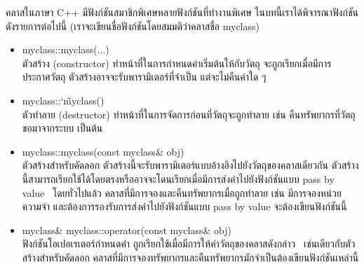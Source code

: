 ค{\wbr}ลา{\wbr}ส{\wbr}ใน{\wbr}ภาษา C++ มี{\wbr}ฟังก์ชัน{\wbr}สมาชิกพิเศษ{\wbr}หลาย{\wbr}ฟังก์ชัน{\wbr}ที่ทำงาน{\wbr}พิเศษ ใน{\wbr}บท{\wbr}นี้{\wbr}เรา{\wbr}ได้{\wbr}พิจารณา{\wbr}ฟังก์ชัน{\wbr}ดัง{\wbr}รายการ{\wbr}ต่อไปนี้ (เรา{\wbr}จะ{\wbr}เขียน{\wbr}ชื่อ{\wbr}ฟังก์ชัน{\wbr}โดย{\wbr}สมมติ{\wbr}ว่า{\wbr}ค{\wbr}ลา{\wbr}ส{\wbr}ชื่อ {\ct myclass})
\begin{itemize}
\item {\ct myclass::myclass(...)} \\ ตัว{\wbr}สร้าง (constructor)
  ทำ{\wbr}หน้าที่{\wbr}ใน{\wbr}การ{\wbr}กำหนด{\wbr}ค่า{\wbr}เริ่มต้น{\wbr}ให้{\wbr}กับ{\wbr}วัตถุ จะ{\wbr}ถูก{\wbr}เรียก{\wbr}เมื่อ{\wbr}มี{\wbr}การ{\wbr}ประกาศ{\wbr}วัตถุ{\wbr}
  ตัว{\wbr}สร้าง{\wbr}อาจ{\wbr}จะ{\wbr}รับ{\wbr}พารามิเตอร์{\wbr}ที่{\wbr}จำเป็น แต่{\wbr}จะ{\wbr}ไม่{\wbr}คืน{\wbr}ค่า{\wbr}ใด ๆ
\item {\ct myclass::\char`\~myclass()} \\ ตัว{\wbr}ทำลาย (destructor)
  ทำ{\wbr}หน้าที่{\wbr}ใน{\wbr}การ{\wbr}จัดการ{\wbr}ก่อน{\wbr}ที่{\wbr}วัตถุ{\wbr}จะ{\wbr}ถูก{\wbr}ทำลาย เช่น คืน{\wbr}ทรัพยากร{\wbr}ที่{\wbr}วัตถุ{\wbr}ขอ{\wbr}มา{\wbr}จาก{\wbr}ระบบ เป็นต้น{\wbr}
\item {\ct myclass::myclass(const myclass\& obj)} \\ ตัว{\wbr}สร้าง{\wbr}สำหรับ{\wbr}คัดลอก{\wbr}
  ตัว{\wbr}สร้าง{\wbr}นี้{\wbr}จะ{\wbr}รับ{\wbr}พารามิเตอร์{\wbr}แบบ{\wbr}อ้างอิง{\wbr}ไป{\wbr}ยัง{\wbr}วัตถุ{\wbr}ของ{\wbr}ค{\wbr}ลา{\wbr}ส{\wbr}เดียวกัน{\wbr}
  ตัว{\wbr}สร้าง{\wbr}นี้{\wbr}สามารถ{\wbr}เรียก{\wbr}ใช้ได้{\wbr}โดย{\wbr}ตรง{\wbr}หรือ{\wbr}อาจ{\wbr}จะ{\wbr}โดน{\wbr}เรียก{\wbr}เมื่อ{\wbr}มี{\wbr}การ{\wbr}ส่ง{\wbr}ค่า{\wbr}ไป{\wbr}ยัง{\wbr}ฟังก์ชัน{\wbr}แบบ{\wbr}
  pass by value \ โดย{\wbr}ทั่วไป{\wbr}แล้ว ค{\wbr}ลา{\wbr}ส{\wbr}ที่{\wbr}มี{\wbr}การ{\wbr}จอง{\wbr}และ{\wbr}คืน{\wbr}ทรัพยากร{\wbr}เมื่อ{\wbr}ถูก{\wbr}ทำลาย เช่น{\wbr}
  มี{\wbr}การ{\wbr}จอง{\wbr}หน่วยความจำ และ{\wbr}ต้องการ{\wbr}รองรับ{\wbr}การ{\wbr}ส่ง{\wbr}ค่า{\wbr}ไป{\wbr}ยัง{\wbr}ฟังก์ชัน{\wbr}แบบ pass by value
  จะ{\wbr}ต้อง{\wbr}เขียน{\wbr}ฟังก์ชัน{\wbr}นี้{\wbr}
\item {\ct myclass\& myclass::operator(const myclass\& obj)}
  \\ ฟังก์ชัน{\wbr}โอ{\wbr}เปอเรเตอร์{\wbr}กำหนด{\wbr}ค่า ถูก{\wbr}เรียก{\wbr}ใช้{\wbr}เมื่อ{\wbr}มี{\wbr}การ{\wbr}ให้{\wbr}ค่า{\wbr}วัตถุ{\wbr}ของ{\wbr}ค{\wbr}ลา{\wbr}ส{\wbr}ดังกล่าว{\wbr}
  \ เช่นเดียวกับ{\wbr}ตัว{\wbr}สร้าง{\wbr}สำหรับ{\wbr}คัดลอก{\wbr}
  ค{\wbr}ลา{\wbr}ส{\wbr}ที่{\wbr}มี{\wbr}การ{\wbr}จอง{\wbr}ทรัพยากร{\wbr}และ{\wbr}คืน{\wbr}ทรัพยากร{\wbr}มัก{\wbr}จำเป็น{\wbr}ต้อง{\wbr}เขียน{\wbr}ฟังก์ชัน{\wbr}เหล่านี้{\wbr}
\end{itemize}

